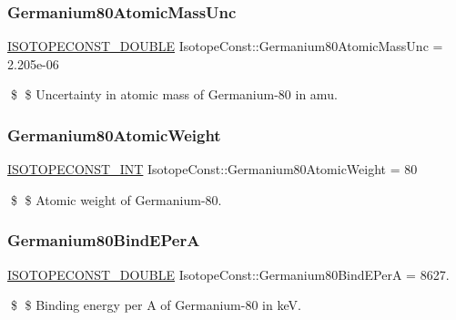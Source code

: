 \subsubsection{\texorpdfstring{Germanium80\+Atomic\+Mass\+Unc}{Germanium80AtomicMassUnc}}
{\footnotesize\ttfamily \mbox{\hyperlink{group___isotope_const-_macros_ga8f45a7272ce02c0b4c65c44636ed719a}{I\+S\+O\+T\+O\+P\+E\+C\+O\+N\+S\+T\+\_\+\+D\+O\+U\+B\+LE}} Isotope\+Const\+::\+Germanium80\+Atomic\+Mass\+Unc = 2.\+205e-\/06}

\$ \$ Uncertainty in atomic mass of Germanium-\/80 in amu. \mbox{\label{group___isotope_const-_germanium-_ge80_ga6c11654ea7bef7f76d905b5743a0f67e}} 
\subsubsection{\texorpdfstring{Germanium80\+Atomic\+Weight}{Germanium80AtomicWeight}}
{\footnotesize\ttfamily \mbox{\hyperlink{group___isotope_const-_macros_ga5f18360b3e99483a35c32d789e62621c}{I\+S\+O\+T\+O\+P\+E\+C\+O\+N\+S\+T\+\_\+\+I\+NT}} Isotope\+Const\+::\+Germanium80\+Atomic\+Weight = 80}

\$ \$ Atomic weight of Germanium-\/80. \mbox{\label{group___isotope_const-_germanium-_ge80_gaf0ad4ec798d3bacf71b3709e39253bf8}} 
\subsubsection{\texorpdfstring{Germanium80\+Bind\+E\+PerA}{Germanium80BindEPerA}}
{\footnotesize\ttfamily \mbox{\hyperlink{group___isotope_const-_macros_ga8f45a7272ce02c0b4c65c44636ed719a}{I\+S\+O\+T\+O\+P\+E\+C\+O\+N\+S\+T\+\_\+\+D\+O\+U\+B\+LE}} Isotope\+Const\+::\+Germanium80\+Bind\+E\+PerA = 8627.}

\$ \$ Binding energy per A of Germanium-\/80 in keV. \mbox{\label{group___isotope_const-_germanium-_ge80_gaa93a00342689c00bcd4d0a6d96925efc}} 
